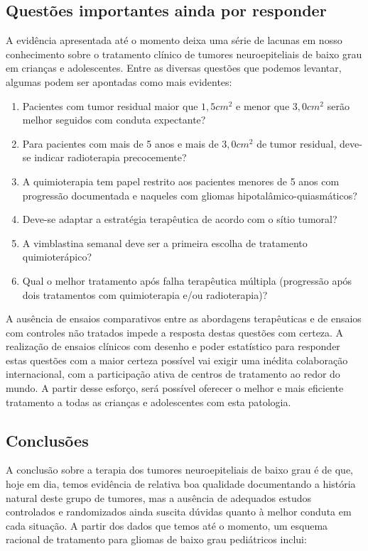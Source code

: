 \documentclass[11pt,a4paper,oldfontcommands]{memoir}
\begin{document}
\subsection{Questões importantes ainda por responder}

A evidência apresentada até o momento deixa uma série de lacunas em nosso conhecimento sobre o tratamento clínico de tumores neuroepiteliais de baixo grau em crianças e adolescentes. Entre as diversas questões que podemos levantar, algumas podem ser apontadas como mais evidentes:

\begin{enumerate}
\item Pacientes com tumor residual maior que \(1,5 cm^2\) e menor que \(3,0 cm^2\) serão melhor seguidos com conduta expectante? 
\item Para pacientes com mais de 5 anos e mais de \(3,0 cm^2\) de tumor residual, deve-se indicar radioterapia precocemente? 
\item A quimioterapia tem papel restrito aos pacientes menores de 5 anos com progressão documentada e naqueles com gliomas hipotalâmico-quiasmáticos? 
\item Deve-se adaptar a estratégia terapêutica de acordo com o sítio tumoral?
\item A vimblastina semanal deve ser a primeira escolha de tratamento quimioterápico?
\item Qual o melhor tratamento após falha terapêutica múltipla (progressão após dois tratamentos com quimioterapia e/ou radioterapia)?
\end{enumerate}

A ausência de ensaios comparativos entre as abordagens terapêuticas e de ensaios com controles não tratados impede a resposta destas questões com certeza. A realização de ensaios clínicos com desenho e poder estatístico para responder estas questões com a maior certeza possível vai exigir uma inédita colaboração internacional, com a participação ativa de centros de tratamento ao redor do mundo. A partir desse esforço, será possível oferecer o melhor e mais eficiente tratamento a todas as crianças e adolescentes com esta patologia.

\subsection{Conclusões}

A conclusão sobre a terapia dos tumores neuroepiteliais de baixo grau é de que, hoje em dia, temos evidência de relativa boa qualidade documentando a história natural deste grupo de tumores, mas a ausência de adequados estudos controlados e randomizados ainda suscita dúvidas quanto à melhor conduta em cada situação. A partir dos dados que temos até o momento, um esquema racional de tratamento para gliomas de baixo grau pediátricos inclui:
\end{document}
